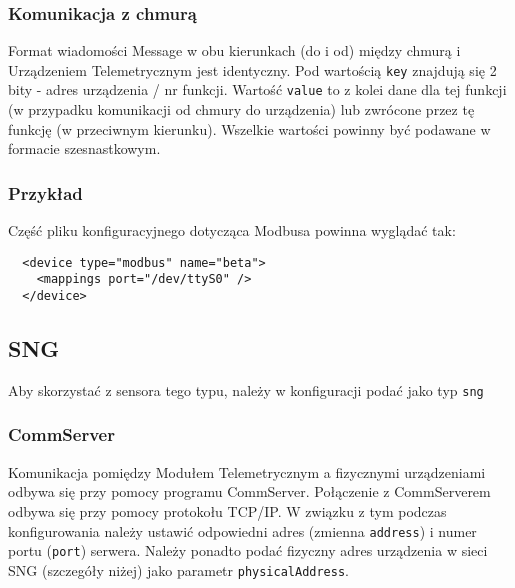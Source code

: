 \documentclass[11pt]{article}
\begin{document}
\subsubsection{Komunikacja z chmurą}
Format wiadomości Message w obu kierunkach (do i od) między chmurą i Urządzeniem Telemetrycznym jest identyczny.
Pod wartością \verb|key| znajdują się 2 bity - adres urządzenia / nr funkcji. Wartość \verb|value| to z kolei dane
dla tej funkcji (w przypadku komunikacji od chmury do urządzenia) lub zwrócone przez tę funkcję (w przeciwnym kierunku).
Wszelkie wartości powinny być podawane w formacie szesnastkowym.

\subsubsection{Przykład}
Część pliku konfiguracyjnego dotycząca Modbusa powinna wyglądać tak:
\begin{verbatim}
  <device type="modbus" name="beta">
    <mappings port="/dev/ttyS0" />
  </device>
\end{verbatim}


\subsection{SNG}
Aby skorzystać z sensora tego typu, należy w konfiguracji podać jako typ \verb|sng|
\subsubsection{CommServer}
Komunikacja pomiędzy Modułem Telemetrycznym a fizycznymi urządzeniami odbywa się przy pomocy
programu CommServer. Połączenie z CommServerem odbywa się przy pomocy protokołu TCP/IP.
W związku z tym podczas konfigurowania należy ustawić odpowiedni adres (zmienna \verb|address|)
i numer portu (\verb|port|) serwera. Należy ponadto podać fizyczny adres urządzenia w sieci 
SNG (szczegóły niżej) jako parametr \verb|physicalAddress|.
\end{document}
